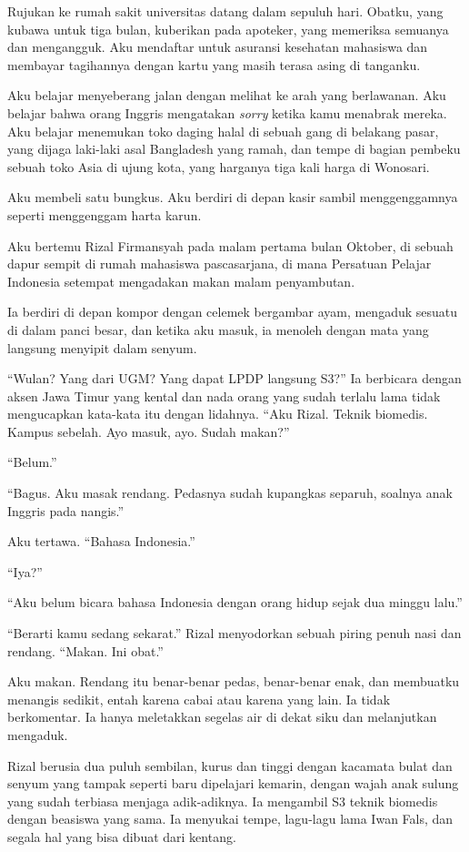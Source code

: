\documentclass[11pt,twoside,openany]{book}
\makeatletter
\newcommand{\scenebreak}{\par\vspace{0.9em}{\centering\textsc{*\hspace{0.7em}*\hspace{0.7em}*}\par}\vspace{0.9em}\@afterindentfalse\@afterheading}
\makeatother
\begin{document}
Rujukan ke rumah sakit universitas datang dalam sepuluh hari. Obatku, yang kubawa untuk tiga bulan, kuberikan pada apoteker, yang memeriksa semuanya dan mengangguk. Aku mendaftar untuk asuransi kesehatan mahasiswa dan membayar tagihannya dengan kartu yang masih terasa asing di tanganku.

Aku belajar menyeberang jalan dengan melihat ke arah yang berlawanan. Aku belajar bahwa orang Inggris mengatakan \emph{sorry} ketika kamu menabrak mereka. Aku belajar menemukan toko daging halal di sebuah gang di belakang pasar, yang dijaga laki-laki asal Bangladesh yang ramah, dan tempe di bagian pembeku sebuah toko Asia di ujung kota, yang harganya tiga kali harga di Wonosari.

Aku membeli satu bungkus. Aku berdiri di depan kasir sambil menggenggamnya seperti menggenggam harta karun.

\scenebreak
Aku bertemu Rizal Firmansyah pada malam pertama bulan Oktober, di sebuah dapur sempit di rumah mahasiswa pascasarjana, di mana Persatuan Pelajar Indonesia setempat mengadakan makan malam penyambutan.

Ia berdiri di depan kompor dengan celemek bergambar ayam, mengaduk sesuatu di dalam panci besar, dan ketika aku masuk, ia menoleh dengan mata yang langsung menyipit dalam senyum.

``Wulan? Yang dari UGM? Yang dapat LPDP langsung S3?'' Ia berbicara dengan aksen Jawa Timur yang kental dan nada orang yang sudah terlalu lama tidak mengucapkan kata-kata itu dengan lidahnya. ``Aku Rizal. Teknik biomedis. Kampus sebelah. Ayo masuk, ayo. Sudah makan?''

``Belum.''

``Bagus. Aku masak rendang. Pedasnya sudah kupangkas separuh, soalnya anak Inggris pada nangis.''

Aku tertawa. ``Bahasa Indonesia.''

``Iya?''

``Aku belum bicara bahasa Indonesia dengan orang hidup sejak dua minggu lalu.''

``Berarti kamu sedang sekarat.'' Rizal menyodorkan sebuah piring penuh nasi dan rendang. ``Makan. Ini obat.''

Aku makan. Rendang itu benar-benar pedas, benar-benar enak, dan membuatku menangis sedikit, entah karena cabai atau karena yang lain. Ia tidak berkomentar. Ia hanya meletakkan segelas air di dekat siku dan melanjutkan mengaduk.

Rizal berusia dua puluh sembilan, kurus dan tinggi dengan kacamata bulat dan senyum yang tampak seperti baru dipelajari kemarin, dengan wajah anak sulung yang sudah terbiasa menjaga adik-adiknya. Ia mengambil S3 teknik biomedis dengan beasiswa yang sama. Ia menyukai tempe, lagu-lagu lama Iwan Fals, dan segala hal yang bisa dibuat dari kentang.
\end{document}
